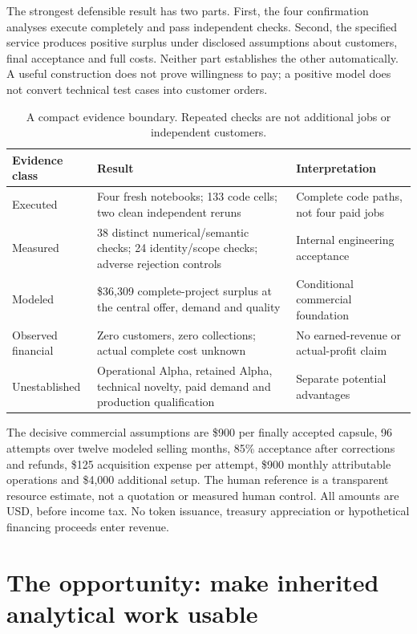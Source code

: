 The strongest defensible result has two parts. First, the four confirmation analyses execute completely and pass independent checks. Second, the specified service produces positive surplus under disclosed assumptions about customers, final acceptance and full costs. Neither part establishes the other automatically. A useful construction does not prove willingness to pay; a positive model does not convert technical test cases into customer orders.

\begin{table}[htbp]\centering\small
\begin{tabularx}{\linewidth}{@{}p{.27\linewidth}Yp{.22\linewidth}@{}}\toprule
Evidence class & Result & Interpretation\\\midrule
Executed & Four fresh notebooks; 133 code cells; two clean independent reruns & Complete code paths, not four paid jobs\\
Measured & 38 distinct numerical/semantic checks; 24 identity/scope checks; adverse rejection controls & Internal engineering acceptance\\
Modeled & \$36,309 complete-project surplus at the central offer, demand and quality & Conditional commercial foundation\\
Observed financial & Zero customers, zero collections; actual complete cost unknown & No earned-revenue or actual-profit claim\\
Unestablished & Operational Alpha, retained Alpha, technical novelty, paid demand and production qualification & Separate potential advantages\\\bottomrule
\end{tabularx}
\caption{A compact evidence boundary. Repeated checks are not additional jobs or independent customers.}
\end{table}

The decisive commercial assumptions are \$900 per finally accepted capsule, 96 attempts over twelve modeled selling months, 85\% acceptance after corrections and refunds, \$125 acquisition expense per attempt, \$900 monthly attributable operations and \$4,000 additional setup. The human reference is a transparent resource estimate, not a quotation or measured human control. All amounts are USD, before income tax. No token issuance, treasury appreciation or hypothetical financing proceeds enter revenue.

\tableofcontents
\clearpage

\section{The opportunity: make inherited analytical work usable}
